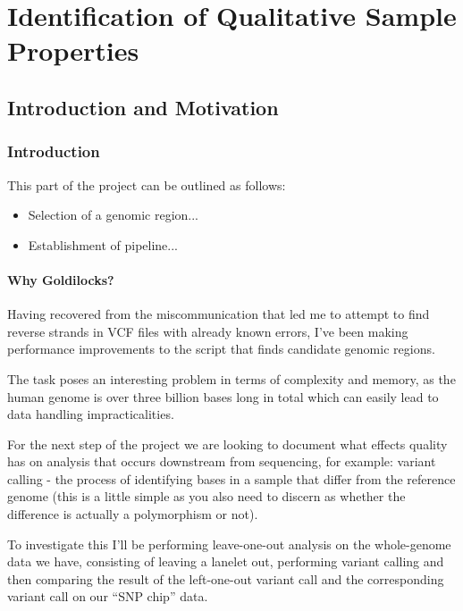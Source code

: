 \part{Identification of Qualitative Sample Properties}
\chapter{Introduction and Motivation}
\ifpdf
    \graphicspath{{Chapter5/Figs/Raster/}{Chapter5/Figs/PDF/}{Chapter5/Figs/}}
\else
    \graphicspath{{Chapter5/Figs/Vector/}{Chapter5/Figs/}}
\fi

\section{Introduction}

This part of the project can be outlined as follows:

\begin{itemize}
    \item Selection of a genomic region...
    \item Establishment of pipeline...
\end{itemize}

\subsection{Why Goldilocks?}

Having recovered from the miscommunication that led me to attempt to find
reverse strands in VCF files with already known errors, I’ve been making
performance improvements to the script that finds candidate genomic regions.

The task poses an interesting problem in terms of complexity and memory, as the
human genome is over three billion bases long in total which can easily lead to
data handling impracticalities.

For the next step of the project we are looking to document what effects quality
has on analysis that occurs downstream from sequencing, for example: variant
calling - the process of identifying bases in a sample that differ from the
reference genome (this is a little simple as you also need to discern as
whether the difference is actually a polymorphism or not).

To investigate this I’ll be performing leave-one-out analysis on the
whole-genome data we have, consisting of leaving a lanelet out, performing
variant calling and then comparing the result of the left-one-out variant call
and the corresponding variant call on our “SNP chip” data.

